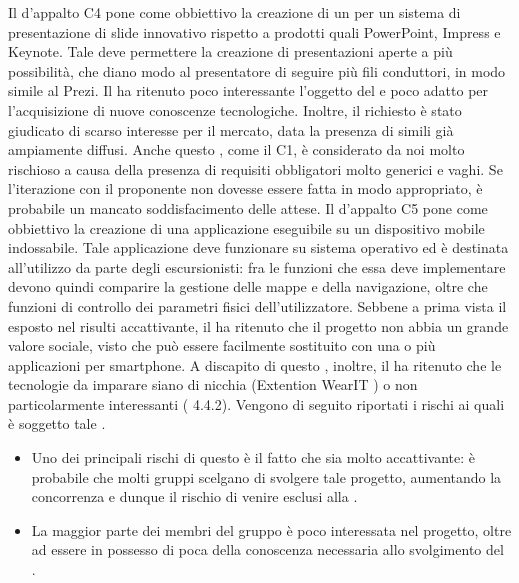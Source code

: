 			Il  d'appalto C4 pone come obbiettivo la creazione di un  per un sistema di presentazione di slide innovativo rispetto a prodotti quali PowerPoint, Impress e Keynote. Tale  deve permettere la creazione di presentazioni aperte a più possibilità, che diano modo al presentatore di seguire più fili conduttori, in modo simile al  Prezi.
			Il  ha ritenuto poco interessante l'oggetto del  e poco adatto per l'acquisizione di nuove conoscenze tecnologiche. Inoltre, il  richiesto è stato giudicato di scarso interesse per il mercato, data la presenza di  simili già ampiamente diffusi.
			Anche questo , come il C1, è considerato da noi molto rischioso a causa della presenza di requisiti obbligatori molto generici e vaghi. Se l'iterazione con il proponente non dovesse essere fatta in modo appropriato, è probabile un mancato soddisfacimento delle attese.
			Il  d'appalto C5 pone come obbiettivo la creazione di una applicazione eseguibile su un dispositivo mobile indossabile. Tale applicazione deve funzionare su sistema operativo  ed è destinata all'utilizzo da parte degli escursionisti: fra le funzioni che essa deve implementare devono quindi comparire la gestione delle mappe e della navigazione, oltre che funzioni di controllo dei parametri fisici dell'utilizzatore.
		Sebbene a prima vista il  esposto nel  risulti accattivante, il  ha ritenuto che il progetto non abbia un grande valore sociale, visto che può essere facilmente sostituito con una o più applicazioni per smartphone. A discapito di questo , inoltre, il  ha ritenuto che le tecnologie da imparare siano di nicchia (Extention WearIT ) o non particolarmente interessanti ( 4.4.2).
			Vengono di seguito riportati i rischi ai quali è soggetto tale .
			\begin{itemize}
				\item Uno dei principali rischi di questo  è il fatto che sia molto accattivante: è probabile che molti gruppi scelgano di svolgere tale progetto, aumentando la concorrenza e dunque il rischio di venire esclusi alla .
				\item La maggior parte dei membri del gruppo è poco interessata nel progetto, oltre ad essere in possesso di poca della conoscenza necessaria allo svolgimento del .
			\end{itemize}
